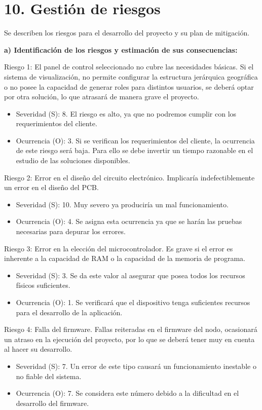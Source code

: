 \section{10. Gestión de riesgos}
\label{sec:riesgos}
Se describen los riesgos para el desarrollo del proyecto y su plan de mitigación.

\textbf{a) Identificación de los riesgos y estimación de sus consecuencias:}
 
Riesgo 1: El panel de control seleccionado no cubre las necesidades básicas. Si el sistema de visualización, no permite configurar la estructura jerárquica geográfica o no posee la capacidad de generar roles para distintos usuarios, se deberá optar por otra solución, lo que atrasará de manera grave el proyecto.
\begin{itemize}
\item Severidad (S): 8. El riesgo es alto, ya que no podremos cumplir con los requerimientos del cliente.
\item Ocurrencia (O): 3. Si se verifican los requerimientos del cliente, la ocurrencia de este riesgo será baja. Para ello se debe invertir un tiempo razonable en el estudio de las soluciones disponibles.
\end{itemize}   

Riesgo 2: Error en el diseño del circuito electrónico. Implicaría indefectiblemente un error en el diseño del PCB.
\begin{itemize}
\item Severidad (S): 10. Muy severo ya produciría un mal funcionamiento. 
\item Ocurrencia (O): 4. Se asigna esta ocurrencia ya que se harán las pruebas necesarias para depurar los errores.
\end{itemize}

Riesgo 3: Error en la elección del microcontrolador. Es grave si el error es inherente a la capacidad de RAM o la capacidad de la memoria de programa.
\begin{itemize}
\item Severidad (S): 3. Se da este valor al asegurar que posea todos los recursos físicos suficientes.
\item Ocurrencia (O): 1. Se verificará que el dispositivo tenga suficientes recursos para el desarrollo de la aplicación.
\end{itemize}

Riesgo 4: Falla del firmware. Fallas reiteradas en el firmware del nodo, ocasionará un atraso en la ejecución del proyecto, por lo que se deberá tener muy en cuenta al hacer su desarrollo. 
\begin{itemize}
\item Severidad (S): 7. Un error de este tipo causará un funcionamiento inestable o no fiable del sistema.
\item Ocurrencia (O): 7. Se considera este número debido a la dificultad en el desarrollo del firmware.
\end{itemize}

